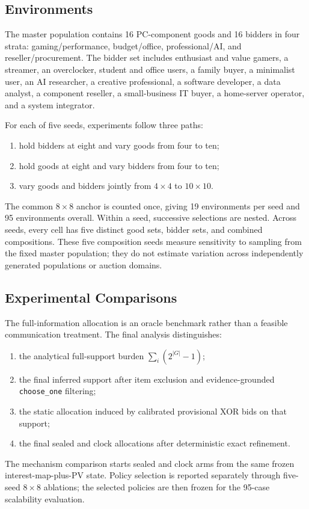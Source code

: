 \subsection{Environments}

The master population contains 16 PC-component goods and 16 bidders in four
strata: gaming/performance, budget/office, professional/AI, and
reseller/procurement. The bidder set includes enthusiast and value gamers, a
streamer, an overclocker, student and office users, a family buyer, a
minimalist user, an AI researcher, a creative professional, a software
developer, a data analyst, a component reseller, a small-business IT buyer,
a home-server operator, and a system integrator.

For each of five seeds, experiments follow three paths:
\begin{enumerate}[leftmargin=*]
    \item hold bidders at eight and vary goods from four to ten;
    \item hold goods at eight and vary bidders from four to ten;
    \item vary goods and bidders jointly from \(4\times4\) to \(10\times10\).
\end{enumerate}
The common \(8\times8\) anchor is counted once, giving 19 environments per
seed and 95 environments overall. Within a seed, successive selections are
nested. Across seeds, every cell has five distinct good sets, bidder sets,
and combined compositions. These five composition seeds measure sensitivity
to sampling from the fixed master population; they do not estimate variation
across independently generated populations or auction domains.

\subsection{Experimental Comparisons}

The full-information allocation is an oracle benchmark rather than a
feasible communication treatment. The final analysis distinguishes:
\begin{enumerate}[leftmargin=*]
    \item the analytical full-support burden
    \(\sum_i(2^{|G|}-1)\);
    \item the final inferred support after item exclusion and
    evidence-grounded \texttt{choose\_one} filtering;
    \item the static allocation induced by calibrated provisional XOR bids on
    that support;
    \item the final sealed and clock allocations after deterministic exact
    refinement.
\end{enumerate}
The mechanism comparison starts sealed and clock arms from the same frozen
interest-map-plus-PV state. Policy selection is reported separately through
five-seed \(8\times8\) ablations; the selected policies are then frozen for
the 95-case scalability evaluation.

